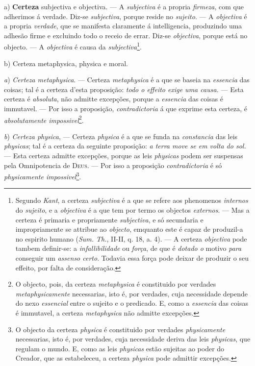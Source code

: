 a) \textbf{Certeza} subjectiva e objectiva. --- A \emph{subjectiva} é a propria \emph{firmeza}, com que adherimos á verdade. Diz-se \emph{subjectiva}, porque reside no \emph{sujeito}. --- A \emph{objectiva} é a propria \emph{verdade}, que se manifesta claramente á intelligencia, produzindo uma adhesão firme e excluindo todo o receio de errar. Diz-se \emph{objectiva}, porque está no objecto. --- A \emph{objectiva} é causa da \emph{subjectiva}\footnote{Segundo \emph{Kant}, a certeza \emph{subjectiva} é a que se refere aos phenomenos \emph{internos} do \emph{sujeito}, e a \emph{objectiva} é a que tem por termo os objectos \emph{externos}. --- Mas a certeza é primaria e propriamente \emph{subjectiva}, e só secundaria e impropriamente se attribue ao \emph{objecto}, emquanto este é capaz de produzil-a no espirito humano (\emph{Sum. Th.}, II-II, q. 18, a. 4). --- A certeza \emph{objectiva} pode tambem definir-se: a \emph{infallibilidade} ou \emph{força}, de que é \emph{dotado o} motivo \emph{para} conseguir um \emph{assenso certo}. Todavia essa força pode deixar de produzir o seu effeito, por falta de consideração.}.

b) Certeza metaphysica, physica e moral.

\emph{a}) \emph{Certeza metaphysica}. --- Certeza \emph{metaphysica} é a que se baseia na \emph{essencia} das coisas; tal é a certeza d'esta proposição: \emph{todo o effeito exige uma causa.} --- Esta certeza é \emph{absoluta}, não admitte excepções, porque a \emph{essencia} das coisas é immutavel. --- Por isso a proposição, \emph{contradictoria} á que exprime esta certeza, é \emph{absolutamente impossivel}\footnote{O objecto, pois, da certeza \emph{metaphysica} é constituido por verdades \emph{metaphysicamente} necessarias, isto é, por verdades, cuja necessidade depende do nexo \emph{essencial} entre o sujeito e o predicado. E, como a \emph{essencia} das coisas é immutavel, a certeza \emph{metaphysica} não admitte excepções.}.

\emph{b}) \emph{Certeza physica}, --- Certeza \emph{physica} é a que se funda na \emph{constancia} das leis \emph{physicas}; tal é a certeza da seguinte proposição: \emph{a terra move se em volta do sol.} --- Esta certeza admitte excepções, porque as leis \emph{physicas} podem ser suspensas pela Omnipotencia de \textsc{Deus}. --- Por isso a proposição \emph{contradictoria} é só \emph{physicamente impossivel}\footnote{O objecto da certeza \emph{physica} é constituido por verdades \emph{physicamente} necessarias, isto é, por verdades, cuja necessidade deriva das leis \emph{physicas}, que regulam o mundo. E, como as leis \emph{physicas} estão sujeitas ao poder do Creador, que as estabeleceu, a certeza \emph{physica} pode admittir excepções.}.

